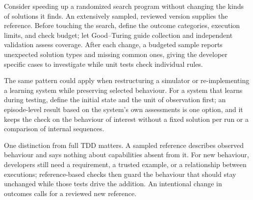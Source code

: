 \documentclass[10pt,letterpaper]{article}
\begin{document}
Consider speeding up a randomized search program without changing the kinds of solutions
it finds. An extensively sampled, reviewed version supplies the reference. Before touching
the search, define the outcome categories, execution limits, and check budget; let
Good--Turing guide collection and independent validation assess coverage. After each
change, a budgeted sample reports unexpected solution types and missing common ones,
giving the developer specific cases to investigate while unit tests check individual
rules.

The same pattern could apply when restructuring a simulator or re-implementing a learning
system while preserving selected behaviour. For a system that learns during testing,
define the initial state and the unit of observation first; an episode-level result based
on the system's own assessments is one option, and it keeps the check on the behaviour of
interest without a fixed solution per run or a comparison of internal sequences.

One distinction from full TDD matters. A sampled reference describes observed behaviour
and says nothing about capabilities absent from it. For new behaviour, developers still
need a requirement, a trusted example, or a relationship between executions;
reference-based checks then guard the behaviour that should stay unchanged while those
tests drive the addition. An intentional change in outcomes calls for a reviewed new
reference.
\end{document}
